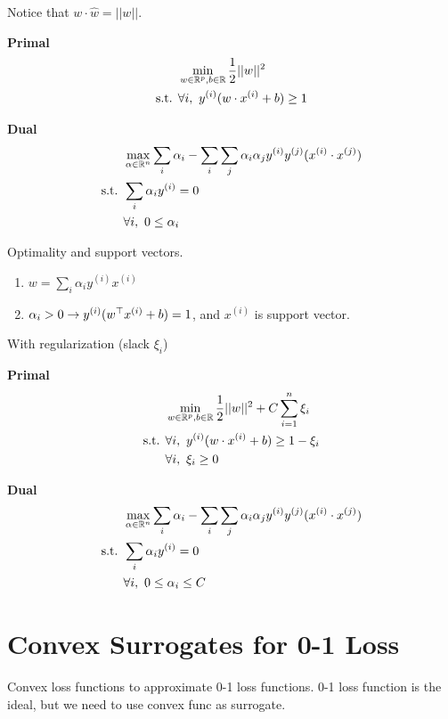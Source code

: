 \documentclass[a4paper]{report}
\begin{document}
Notice that $w \cdot \hat w=||w||$.

\textbf{Primal}
\begin{align*}
& \min_{w\in \mathbb{R}^p, b\in \mathbb{R}} \frac{1}{2}||w||^2\\ 
\text{s.t. } & \forall i,~ y^{(i)}(w \cdot x^{(i)}+b)\geq 1 
\end{align*}

\textbf{Dual}
\begin{align*}
& \max_{\alpha \in \mathbb{R}^n} \sum_i \alpha_i -\sum_i\sum_j \alpha_i \alpha_j y^{(i)}y^{(j)}(x^{(i)}\cdot x^{(j)}) \\
\text{s.t. } & \sum_i \alpha_i y^{(i)} = 0\\
& \forall i,~ 0\leq\alpha_i 
\end{align*}

Optimality and support vectors. 
\begin{enumerate}
\item $w=\sum_i \alpha_i y^{(i)} x^{(i)}$ 
\item $\alpha_i >0 \rightarrow y^{(i)}(w^\top x^{(i)}+b)=1$, and $x^{(i)}$ is support vector.
\end{enumerate}

With regularization (slack $\xi_i$)

\textbf{Primal}
\begin{align*}
& \min_{w\in \mathbb{R}^p, b\in \mathbb{R}} \frac{1}{2}||w||^2+C\sum_{i=1}^n\xi_i\\ 
\text{s.t. } & \forall i,~ y^{(i)}(w \cdot x^{(i)}+b)\geq 1 -\xi_i \\
& \forall i,~\xi_i \geq 0
\end{align*}

\textbf{Dual}
\begin{align*}
& \max_{\alpha \in \mathbb{R}^n} \sum_i \alpha_i -\sum_i\sum_j \alpha_i \alpha_j y^{(i)}y^{(j)}(x^{(i)}\cdot
x^{(j)}) \\
\text{s.t. } & \sum_i \alpha_i y^{(i)} = 0\\
& \forall i,~0\leq \alpha_i \leq C
\end{align*}

\section{Convex Surrogates for 0-1 Loss}
Convex loss functions to approximate 0-1 loss functions. 0-1 loss function is the ideal, but we need to use convex func as surrogate.
\end{document}
